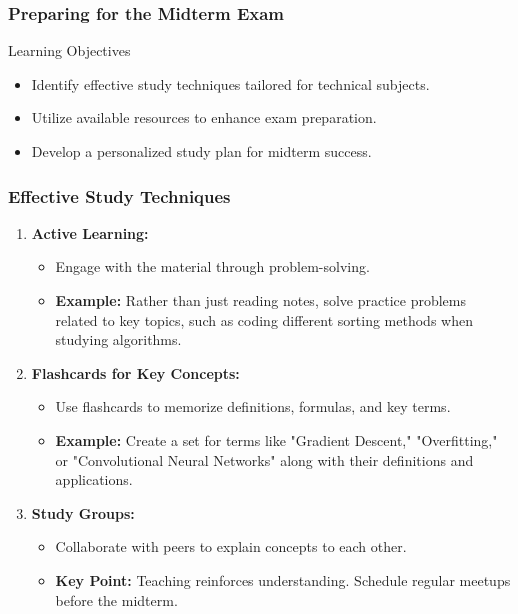 \documentclass[aspectratio=169]{beamer}
\begin{document}
\begin{frame}[fragile]
    \frametitle{Preparing for the Midterm Exam}
    \begin{block}{Learning Objectives}
        \begin{itemize}
            \item Identify effective study techniques tailored for technical subjects.
            \item Utilize available resources to enhance exam preparation.
            \item Develop a personalized study plan for midterm success.
        \end{itemize}
    \end{block}
\end{frame}

\begin{frame}[fragile]
    \frametitle{Effective Study Techniques}
    \begin{enumerate}
        \item \textbf{Active Learning:}
            \begin{itemize}
                \item Engage with the material through problem-solving.
                \item \textbf{Example:} Rather than just reading notes, solve practice problems related to key topics, such as coding different sorting methods when studying algorithms.
            \end{itemize}
        
        \item \textbf{Flashcards for Key Concepts:}
            \begin{itemize}
                \item Use flashcards to memorize definitions, formulas, and key terms.
                \item \textbf{Example:} Create a set for terms like "Gradient Descent," "Overfitting," or "Convolutional Neural Networks" along with their definitions and applications.
            \end{itemize}
        
        \item \textbf{Study Groups:}
            \begin{itemize}
                \item Collaborate with peers to explain concepts to each other.
                \item \textbf{Key Point:} Teaching reinforces understanding. Schedule regular meetups before the midterm.
            \end{itemize}


\end{enumerate}
\end{frame}
\end{document}

